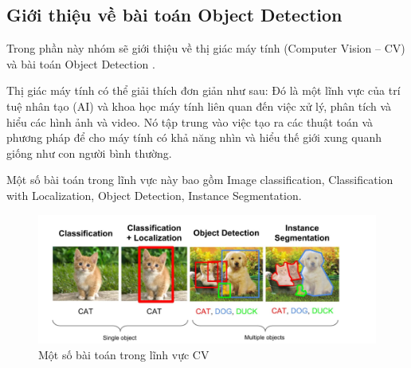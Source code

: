 \subsection{Giới thiệu về bài toán Object Detection}
Trong phần này nhóm sẽ giới thiệu về thị giác máy tính (Computer Vision – CV) và bài toán Object Detection \cite{objectdetection}.

Thị giác máy tính có thể giải thích đơn giản như sau: Đó là một lĩnh vực của trí tuệ nhân tạo (AI) và khoa học máy tính liên quan đến việc xử lý, phân tích và hiểu các hình ảnh và video. Nó tập trung vào việc tạo ra các thuật toán và phương pháp để cho máy tính có khả năng nhìn và hiểu thế giới xung quanh giống như con người bình thường.

Một số bài toán trong lĩnh vực này bao gồm Image classification, Classification with Localization, Object Detection, Instance Segmentation.

\graphicspath{{figures/}}
\begin{figure}[h!]
  \centering
  \includegraphics[scale=0.4]{graphics/Hinh1.png}
  \caption{Một số bài toán trong lĩnh vực CV}
\end{figure}


